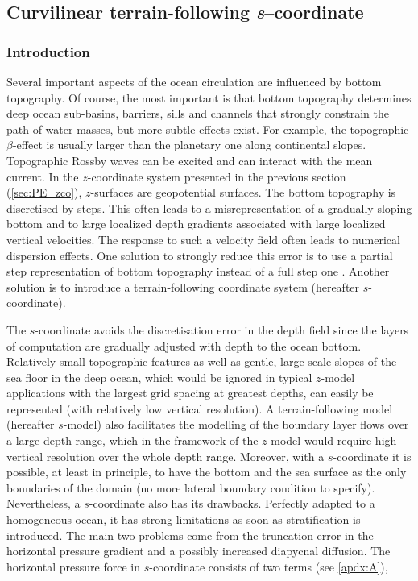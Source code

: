 \documentclass[../main/NEMO_manual]{subfiles}
\begin{document}
\subsection{Curvilinear terrain-following \textit{s}--coordinate}
\label{subsec:PE_sco}

\subsubsection{Introduction}

Several important aspects of the ocean circulation are influenced by bottom topography.
Of course, the most important is that bottom topography determines deep ocean sub-basins, barriers, sills and
channels that strongly constrain the path of water masses, but more subtle effects exist.
For example, the topographic $\beta$-effect is usually larger than the planetary one along continental slopes.
Topographic Rossby waves can be excited and can interact with the mean current.
In the $z$-coordinate system presented in the previous section (\autoref{sec:PE_zco}),
$z$-surfaces are geopotential surfaces.
The bottom topography is discretised by steps.
This often leads to a misrepresentation of a gradually sloping bottom and to
large localized depth gradients associated with large localized vertical velocities.
The response to such a velocity field often leads to numerical dispersion effects.
One solution to strongly reduce this error is to use a partial step representation of bottom topography instead of
a full step one \cite{Pacanowski_Gnanadesikan_MWR98}.
Another solution is to introduce a terrain-following coordinate system (hereafter $s$-coordinate).

The $s$-coordinate avoids the discretisation error in the depth field since the layers of
computation are gradually adjusted with depth to the ocean bottom.
Relatively small topographic features as well as  gentle, large-scale slopes of the sea floor in the deep ocean,
which would be ignored in typical $z$-model applications with the largest grid spacing at greatest depths,
can easily be represented (with relatively low vertical resolution).
A terrain-following model (hereafter $s$-model) also facilitates the modelling of the boundary layer flows over
a large depth range, which in the framework of the $z$-model would require high vertical resolution over
the whole depth range.
Moreover, with a $s$-coordinate it is possible, at least in principle, to have the bottom and the sea surface as
the only boundaries of the domain (no more lateral boundary condition to specify).
Nevertheless, a $s$-coordinate also has its drawbacks. Perfectly adapted to a homogeneous ocean,
it has strong limitations as soon as stratification is introduced.
The main two problems come from the truncation error in the horizontal pressure gradient and
a possibly increased diapycnal diffusion.
The horizontal pressure force in $s$-coordinate consists of two terms (see \autoref{apdx:A}),
\end{document}
